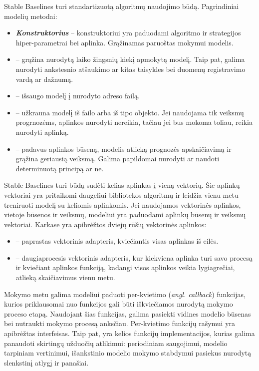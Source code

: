 \documentclass{VUMIFPSbakalaurinis}
\begin{document}
\label{subsubsubsec:stable-baselines_framework}
{
	Stable Baselines turi standartizuotą algoritmų naudojimo būdą. Pagrindiniai modelių metodai:
	\begin{itemize}
		\item \textbf{\textit{Konstruktorius}} -- konstruktoriui yra paduodami algoritmo ir strategijos hiper-parametrai bei aplinka. Grąžinamas paruoštas mokymui modelis.
		
		\item \textbf{} -- grąžina nurodytą laiko žingsnių kiekį apmokytą modelį. Taip pat, galima nurodyti ankstesnio atšaukimo ar kitas taisykles bei duomenų registravimo vardą ar dažnumą.
		
		\item  \textbf{} -- išsaugo modelį į nurodyto adreso failą.
		
		\item  \textbf{} -- užkrauna modelį iš failo arba iš  tipo objekto. Jei naudojama tik veiksmų progrnozėms, aplinkos nurodyti nereikia, tačiau jei bus mokoma toliau, reikia nurodyti aplinką.
		
		\item \textbf{} -- padavus aplinkos būseną, modelis atlieką prognozės apskaičiavimą ir grąžina geriausią veiksmą. Galima papildomai nurodyti ar naudoti determinuotą principą ar ne.
	\end{itemize}
	
	Stable Baselines turi būdą sudėti kelias aplinkas į vieną vektorių. Šie aplinkų vektoriai yra pritaikomi daugeliui bibliotekos algoritmų ir leidžia vienu metu treniruoti modelį su keliomis aplinkomis. Jei naudojamos vektorinės aplinkos, vietoje būsenos ir veiksmų, modeliui yra paduodami aplinkų būsenų ir veiksmų vektoriai. Karkase yra apibrėžtos dviejų rūšių vektorinės aplinkos:
	\begin{itemize}
		\item \textbf{} -- paprastas vektorinis adapteris, kviečiantis visas aplinkas iš eilės.
		\item \textbf{} -- daugiaprocesis vektorinis adapteris, kur kiekviena aplinka turi savo procesą ir kviečiant aplinkos funkciją, kadangi visos aplinkos veikia lygiagrečiai, atlieką skaičiavimus vienu metu.
	\end{itemize}

	Mokymo metu galima modeliui paduoti per-kvietimo (\textit{angl. callback}) funkcijas, kurios priklausomai nuo funkcijos gali būti iškviečiamos nurodytą mokymo proceso etapą. Naudojant šias funkcijas, galima pasiekti vidines modelio būsenas bei nutraukti mokymo procesą anksčiau. Per-kvietimo funkcijų rašymui yra apibrėžtas  interfeisas. Taip pat, yra kelios funkcijų implementacijos, kurias galima panaudoti skirtingų užduočių atlikimui: periodiniam saugojimui, modelio tarpiniam vertinimui, išankstinio modelio mokymo stabdymui pasiekus nurodytą slenkstinį atlygį ir panašiai.
	
}
\end{document}
